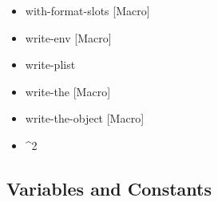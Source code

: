 \documentclass [11pt]{book}
\begin{document}
\begin{itemize}
\item {}with-format-slots [Macro]





\item {}write-env [Macro]





\item {}write-plist





\item {}write-the [Macro]





\item {}write-the-object [Macro]





\item {}^2





\end{itemize}



\subsection{Variables and Constants}

\label{subsec:variablesandconstants}
\end{document}
